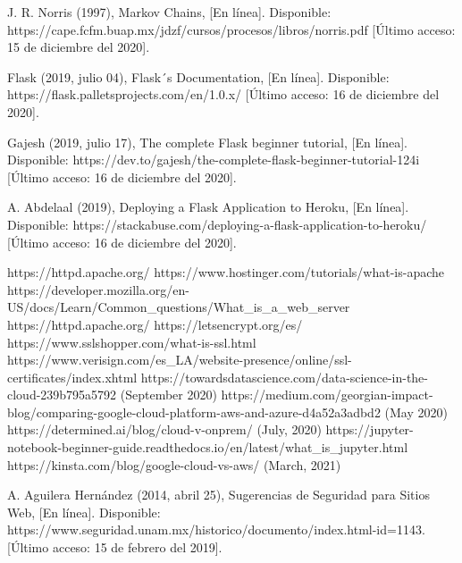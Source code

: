 \documentclass[12pt, a4paper, titlepage]{report}
\begin{document}
\begin{thebibliography}{20}
		J. R. Norris (1997), Markov Chains, [En línea]. Disponible: https://cape.fcfm.buap.mx/jdzf/cursos/procesos/libros/norris.pdf [Último acceso: 15 de diciembre del 2020].

		Flask (2019, julio 04), Flask´s Documentation, [En línea]. Disponible: https://flask.palletsprojects.com/en/1.0.x/ [Último acceso: 16 de diciembre del 2020].

		Gajesh (2019, julio 17), The complete Flask beginner tutorial, [En línea]. Disponible: https://dev.to/gajesh/the-complete-flask-beginner-tutorial-124i [Último acceso: 16 de diciembre del 2020].

		A. Abdelaal (2019), Deploying a Flask Application to Heroku, [En línea]. Disponible: https://stackabuse.com/deploying-a-flask-application-to-heroku/ [Último acceso: 16 de diciembre del 2020].
		
		https://httpd.apache.org/
		https://www.hostinger.com/tutorials/what-is-apache
		https://developer.mozilla.org/en-US/docs/Learn/Common_questions/What_is_a_web_server
		https://httpd.apache.org/
		https://letsencrypt.org/es/
		https://www.sslshopper.com/what-is-ssl.html
		https://www.verisign.com/es_LA/website-presence/online/ssl-certificates/index.xhtml
		https://towardsdatascience.com/data-science-in-the-cloud-239b795a5792 (September 2020)
		https://medium.com/georgian-impact-blog/comparing-google-cloud-platform-aws-and-azure-d4a52a3adbd2 (May 2020)
		https://determined.ai/blog/cloud-v-onprem/ (July, 2020)
		https://jupyter-notebook-beginner-guide.readthedocs.io/en/latest/what_is_jupyter.html 
		https://kinsta.com/blog/google-cloud-vs-aws/ (March, 2021)
    
    
       
		A. Aguilera Hernández (2014, abril 25), Sugerencias de Seguridad para Sitios Web, [En línea]. Disponible: https://www.seguridad.unam.mx/historico/documento/index.html-id=1143. [Último acceso: 15 de febrero del 2019].
	    

\end{thebibliography}
\end{document}
